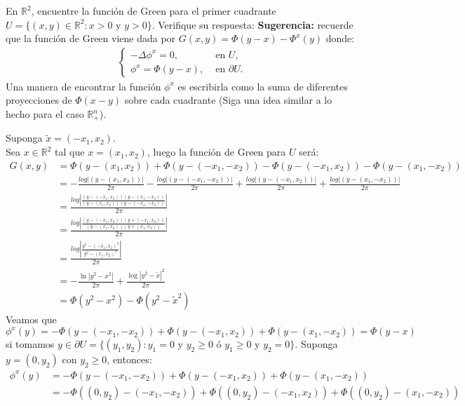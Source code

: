 \begin{homeworkProblem}
  En $\mathbb{R}^{2}$, encuentre la función de Green para el primer cuadrante $U=\{(x,y)\in \mathbb{R}^{2}: x>0 \text{ y } y>0\}$. Verifique su respuesta:
  \textbf{Sugerencia:} recuerde que la función de Green viene dada por $G(x,y)=\Phi(y-x)-\Phi^x(y)$ donde:
  \begin{align*} 
    \begin{cases}
      -\Delta \phi^x=0, &\text{ en } U \text{,}\\
      \phi^x=\Phi(y-x), &\text{ en } \partial U.
    \end{cases} 
  \end{align*}
  Una manera de encontrar la función $\phi^x$ es escribirla como la suma de diferentes proyecciones de $\Phi(x-y)$ sobre cada cuadrante (Siga una idea similar a lo hecho para el caso $\mathbb{R}^{n}_{+}$). 
  \begin{solucion}
    Suponga $\tilde{x}=(-x_1,x_2)$.\\
    Sea $x\in \mathbb{R}^{2}$ tal que $x=(x_1,x_2)$, luego la función de Green para $U$ será:
    \begin{align*}
      G(x,y)&=\Phi(y-(x_1,x_2))+\Phi(y-(-x_1,-x_2))-\Phi(y-(-x_1,x_2))-\Phi(y-(x_1,-x_2))\\
      &=-\frac{log|(y-(x_1,x_2))|}{2\pi}-\frac{log|(y-(-x_1,-x_2))|}{2\pi}+\frac{log|(y-(-x_1,x_2))|}{2\pi}+\frac{log|(y-(x_1,-x_2))|}{2\pi}\\
      &=\frac{log\left| \frac{(y-(-x_1,x_2))(y-(x_1,-x_2))}{(y-(x_1,x_2))(y-(-x_1,-x_2))} \right|}{2\pi}\\
      &=\frac{log\left| \frac{(y-(-x_1,x_2))(y+(-x_1,x_2))}{(y-(x_1,x_2))(y+(x_1,x_2))} \right|}{2\pi}\\
      &=\frac{log\left| \frac{y^2-(-x_1,x_2)^2}{y^2-(x_1,x_2)^2} \right|}{2\pi}\\
      &=-\frac{\ln|y^2-x^2|}{2\pi}+\frac{\log|y^2-\tilde{x}|^2}{2\pi}\\
      &=\Phi(y^2-x^2)-\Phi(y^2-\tilde{x}^2)
    \end{align*}
    Veamos que $\phi^x(y)=-\Phi(y-(-x_1,-x_2))+\Phi(y-(-x_1,x_2))+\Phi(y-(x_1,-x_2))=\Phi(y-x)$ si tomamos $y\in\partial U=\{(y_1,y_2):y_1=0\text{ y } y_2 \geq 0 \text{ ó } y_1 \geq 0 \text{ y } y_2=0\}$.
    Suponga $y=(0,y_2)$ con $y_2\geq 0$, entonces:
    \begin{align*}
      \phi^x(y)&=-\Phi(y-(-x_1,-x_2))+\Phi(y-(-x_1,x_2))+\Phi(y-(x_1,-x_2))\\
      &=-\Phi((0,y_2)-(-x_1,-x_2))+\Phi((0,y_2)-(-x_1,x_2))+\Phi((0,y_2)-(x_1,-x_2))\\

\end{align*}
\end{solucion}
\end{homeworkProblem}
